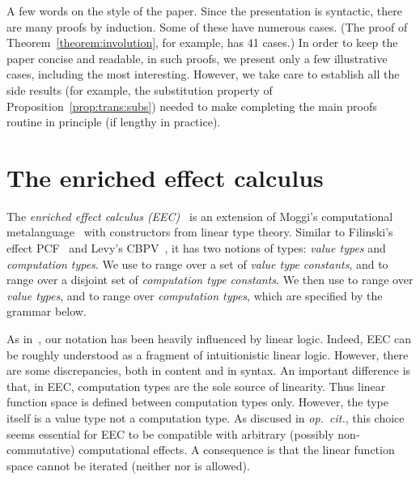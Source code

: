 \documentclass{LMCS}
\begin{document}
A few words on the style of the paper. Since the presentation
is syntactic, there are many proofs by induction. Some of
these have numerous cases. (The proof of Theorem~\ref{theorem:involution}, for example,
has 41 cases.) In order to keep the paper concise and readable, in  such proofs, we 
present only a few illustrative cases, including the most interesting.
However, we take care to establish all the side results (for example, the
substitution property of Proposition~\ref{prop:trans:subs})  needed to make completing
the main proofs routine in principle (if lengthy in practice). 












\section{The enriched effect calculus}
\label{section:calculus}


The \emph{enriched effect calculus (EEC)}~\cite{EMS,EMSb} is an extension of Moggi's 
computational metalanguage~\cite{Moggi:91}
with constructors from linear type theory. 
Similar to Filinski's effect PCF~\cite{Filinski:phd}
and Levy's CBPV~\cite{Levy:book}, it has two notions of types: \emph{value types} and
\emph{computation types}.
We use  to range over a 
set of \emph{value type constants}, and
 to range over a 
disjoint set of \emph{computation type constants}.
We then use  to range over 
\emph{value types}, and 
 to range over \emph{computation types},
which are specified by the grammar below.


As in~\cite{EMS,EMSb}, our notation has been heavily influenced by linear logic.
Indeed, EEC can be roughly understood as a fragment of intuitionistic linear logic.
However, there are some discrepancies, both in content and in syntax.
An important difference is that, in EEC, computation types are the sole source of
linearity. Thus linear function space  is defined between computation types only. 
However, the type  itself is a value type not a computation type.
As discused in \emph{op.\ cit.}, this choice seems
essential for EEC to be compatible with arbitrary (possibly non-commutative) computational effects.
A consequence is that the linear
function space cannot be iterated 
(neither  nor  is allowed).
\end{document}
